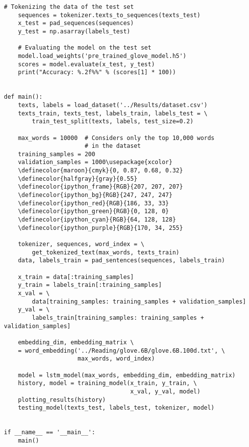 \begin{lstlisting}[language=iPython]
	# Tokenizing the data of the test set
	sequences = tokenizer.texts_to_sequences(texts_test)
	x_test = pad_sequences(sequences)
	y_test = np.asarray(labels_test)
	
	# Evaluating the model on the test set
	model.load_weights('pre_trained_glove_model.h5')
	scores = model.evaluate(x_test, y_test)
	print("Accuracy: %.2f%%" % (scores[1] * 100))


def main():
	texts, labels = load_dataset('../Results/dataset.csv')
	texts_train, texts_test, labels_train, labels_test = \
		train_test_split(texts, labels, test_size=0.2)
	
	max_words = 10000  # Considers only the top 10,000 words 
					   # in the dataset
	training_samples = 200
	validation_samples = 1000\usepackage{xcolor}
	\definecolor{maroon}{cmyk}{0, 0.87, 0.68, 0.32}
	\definecolor{halfgray}{gray}{0.55}
	\definecolor{ipython_frame}{RGB}{207, 207, 207}
	\definecolor{ipython_bg}{RGB}{247, 247, 247}
	\definecolor{ipython_red}{RGB}{186, 33, 33}
	\definecolor{ipython_green}{RGB}{0, 128, 0}
	\definecolor{ipython_cyan}{RGB}{64, 128, 128}
	\definecolor{ipython_purple}{RGB}{170, 34, 255}
	
	tokenizer, sequences, word_index = \
		get_tokenized_text(max_words, texts_train)
	data, labels_train = pad_sentences(sequences, labels_train)
	
	x_train = data[:training_samples]
	y_train = labels_train[:training_samples]
	x_val = \
		data[training_samples: training_samples + validation_samples]
	y_val = \
		labels_train[training_samples: training_samples + validation_samples]
	
	embedding_dim, embedding_matrix \
	= word_embedding('../Reading/glove.6B/glove.6B.100d.txt', \
					 max_words, word_index)
	
	model = lstm_model(max_words, embedding_dim, embedding_matrix)
	history, model = training_model(x_train, y_train, \
									x_val, y_val, model)
	plotting_results(history)
	testing_model(texts_test, labels_test, tokenizer, model)


if __name__ == '__main__':
	main()

\end{lstlisting}
